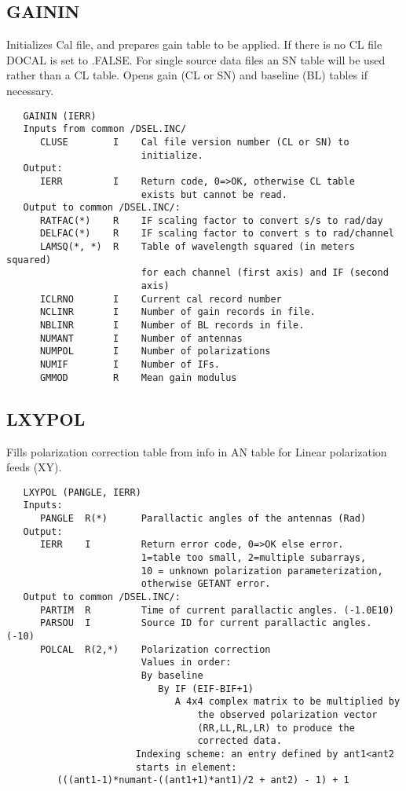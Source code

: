 \subsection{GAININ}
Initializes Cal file, and prepares gain table to be applied.
If there is no CL file DOCAL is set to .FALSE.
For single source data files an SN table will be used rather than a
CL table. Opens gain (CL or SN) and baseline (BL) tables if necessary.
\begin{verbatim}
   GAININ (IERR)
   Inputs from common /DSEL.INC/
      CLUSE        I    Cal file version number (CL or SN) to
                        initialize.
   Output:
      IERR         I    Return code, 0=>OK, otherwise CL table
                        exists but cannot be read.
   Output to common /DSEL.INC/:
      RATFAC(*)    R    IF scaling factor to convert s/s to rad/day
      DELFAC(*)    R    IF scaling factor to convert s to rad/channel
      LAMSQ(*, *)  R    Table of wavelength squared (in meters squared)
                        for each channel (first axis) and IF (second
                        axis)
      ICLRNO       I    Current cal record number
      NCLINR       I    Number of gain records in file.
      NBLINR       I    Number of BL records in file.
      NUMANT       I    Number of antennas
      NUMPOL       I    Number of polarizations
      NUMIF        I    Number of IFs.
      GMMOD        R    Mean gain modulus
\end{verbatim}

\subsection{LXYPOL}
Fills polarization correction table from info in AN table for Linear
polarization feeds (XY).
\begin{verbatim}
   LXYPOL (PANGLE, IERR)
   Inputs:
      PANGLE  R(*)      Parallactic angles of the antennas (Rad)
   Output:
      IERR    I         Return error code, 0=>OK else error.
                        1=table too small, 2=multiple subarrays,
                        10 = unknown polarization parameterization,
                        otherwise GETANT error.
   Output to common /DSEL.INC/:
      PARTIM  R         Time of current parallactic angles. (-1.0E10)
      PARSOU  I         Source ID for current parallactic angles. (-10)
      POLCAL  R(2,*)    Polarization correction
                        Values in order:
                        By baseline
                           By IF (EIF-BIF+1)
                              A 4x4 complex matrix to be multiplied by
                                  the observed polarization vector
                                  (RR,LL,RL,LR) to produce the
                                  corrected data.
                       Indexing scheme: an entry defined by ant1<ant2
                       starts in element:
         (((ant1-1)*numant-((ant1+1)*ant1)/2 + ant2) - 1) + 1
\end{verbatim}

